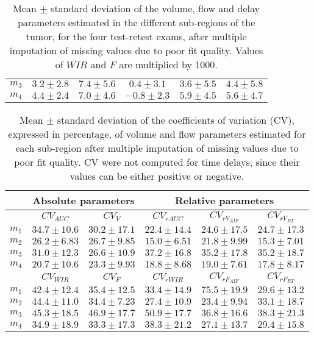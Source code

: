 \begin{table} [hb]
\begin{center}
\begin{tabular}{lccccc}
$m_3$ 	& $3.2 \pm 2.8$		& $7.4 \pm 5.6$		& $0.4 \pm 3.1$		& $3.6 \pm 5.5$ 	& $4.4 \pm 5.8$ \\
$m_4$  	& $4.4 \pm 2.4$		& $7.0 \pm 4.6$		& $-0.8 \pm 2.3$	& $5.9 \pm 4.5$ 	& $5.6 \pm 4.7$ \\
\bottomrule
\end{tabular}
\caption{Mean $\pm$ standard deviation of the volume, flow and delay parameters estimated in the different sub-regions of the tumor, for the four test-retest exams, after multiple imputation of missing values due to poor fit quality. Values of $WIR$ and $F$ are multiplied by 1000.}
\label{tab:RP}
\end{center}
\end{table}

\begin{table}
\begin{center}
\begin{tabular}{lccccc}
\toprule
& \multicolumn{2}{c}{Absolute parameters} & \multicolumn{3}{c}{Relative parameters} \\
\midrule
 & $CV_{AUC}$  & $CV_{V}$  & $CV_{rAUC}$  & $CV_{rV_{AIF}}$  & $CV_{rV_{RT}}$ \\
\midrule
$m_1$  	& $34.7 \pm 10.6$ 	& $30.2 \pm 17.1$ 	& $22.4 \pm 14.4$ 	& $24.6 \pm 17.5$ 	& $24.7 \pm 17.3$ 	\\
$m_2$  	& $26.2 \pm 6.83$ 	& $26.7 \pm 9.85$ 	& $15.0 \pm 6.51$ 	& $21.8 \pm 9.99$ 	& $15.3 \pm 7.01$ 	\\
$m_3$ 	& $31.0 \pm 12.3$ 	& $26.6 \pm 10.9$ 	& $37.2 \pm 16.8$ 	& $35.2 \pm 17.8$ 	& $35.2 \pm 18.7$ 	\\
$m_4$ 	& $20.7 \pm 10.6$ 	& $23.3 \pm 9.93$ 	& $18.8 \pm 8.68$ 	& $19.0 \pm 7.61$ 	& $17.8 \pm 8.17$ 	\\

\midrule
 & $CV_{WIR}$  & $CV_{F}$  & $CV_{rWIR}$ & $CV_{rF_{AIF}}$ & $CV_{rF_{RT}}$ \\
\midrule
$m_1$ 	& $42.4 \pm 12.4$ 	& $35.4 \pm 12.5$ 	& $33.4 \pm 14.9$ 	& $75.5 \pm 19.9$ 	& $29.6 \pm 13.2$ 	\\
$m_2$ 	& $44.4 \pm 11.0$ 	& $34.4 \pm 7.23$ 	& $27.4 \pm 10.9$ 	& $23.4 \pm 9.94$ 	& $33.1 \pm 18.7$	\\
$m_3$ 	& $45.3 \pm 18.5$ 	& $46.9 \pm 17.7$ 	& $50.9 \pm 17.7$ 	& $36.8 \pm 16.6$ 	& $38.3 \pm 21.3$ 	\\
$m_4$  	& $34.9 \pm 18.9$ 	& $33.3 \pm 17.3$ 	& $38.3 \pm 21.2$ 	& $27.1 \pm 13.7$ 	& $29.4 \pm 15.8$ 	\\

\bottomrule
\end{tabular}
\caption{Mean $\pm$ standard deviation of the coefficients of variation (CV), expressed in percentage, of volume and flow parameters estimated for each sub-region after multiple imputation of missing values due to poor fit quality. CV were not computed for time delays, since their values can be either positive or negative.}
\label{tab:RCV}
\end{center}
\end{table}

